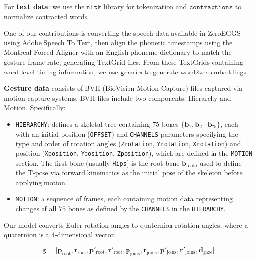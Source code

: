 For \textbf{text data}: we use the $\texttt{nltk}$ library for tokenization and $\texttt{contractions}$ to normalize contracted words.

One of our contributions is converting the speech data available in ZeroEGGS using Adobe Speech To Text, then align the phonetic timestamps using the Montreal Forced Aligner \cite{saxon2020robust} with an English phoneme dictionary to match the gesture frame rate, generating TextGrid files. From these TextGrids containing word-level timing information, we use $\texttt{gensim}$ to generate word2vec embeddings.

\textbf{Gesture data} consists of BVH (BioVision Motion Capture) files captured via motion capture systems. BVH files include two components: Hierarchy and Motion. Specifically:

\begin{itemize}
	\item \texttt{HIERARCHY}: defines a skeletal tree containing 75 bones $\{ \mathbf{b}_1, \mathbf{b}_2 \cdots \mathbf{b}_{75} \}$, each with an initial position (\texttt{OFFSET}) and \texttt{CHANNELS} parameters specifying the type and order of rotation angles (\texttt{Zrotation}, \texttt{Yrotation}, \texttt{Xrotation}) and position (\texttt{Xposition}, \texttt{Yposition}, \texttt{Zposition}), which are defined in the \texttt{MOTION} section. The first bone (usually \texttt{Hips}) is the root bone $\mathbf{b}_{\text{root}}$, used to define the T-pose via forward kinematics as the initial pose of the skeleton before applying motion.
	
	\item \texttt{MOTION}: a sequence of frames, each containing motion data representing changes of all $75$ bones as defined by the \texttt{CHANNELS} in the \texttt{HIERARCHY}.
\end{itemize}

Our model converts Euler rotation angles to quaternion rotation angles, where a quaternion is a 4-dimensional vector.

\begin{equation} \label{eq:gesturevector}
	\mathbf{g} = \Big[ \mathbf{p}_{\text{root}},  \mathbf{r}_{\text{root}},
	\mathbf{ p }'_{\text{root}},  \mathbf{r}'_{\text{root}},
	\mathbf{p}_{\text{joins}},  \mathbf{r}_{\text{joins}},
	\mathbf{p}'_{\text{joins}},  \mathbf{r}'_{\text{joins}},
	\mathbf{d}_{\text{gaze}}
	\Big]
\end{equation}

